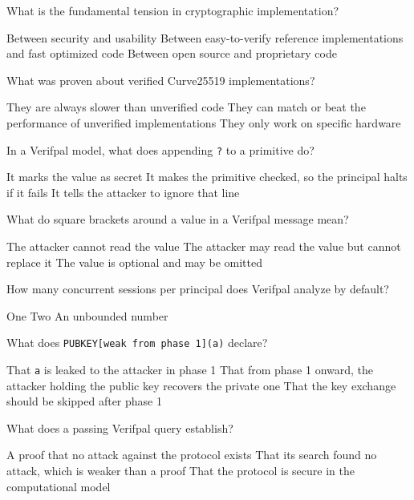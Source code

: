\documentclass[10pt,a4paper,american]{exam}
\begin{document}
\begin{questions}
	\question What is the fundamental tension in cryptographic implementation?
	\begin{randomizechoices}
		\choice Between security and usability
		\CorrectChoice Between easy-to-verify reference implementations and fast optimized code
		\choice Between open source and proprietary code
	\end{randomizechoices}

	\question What was proven about verified Curve25519 implementations?
	\begin{randomizechoices}
		\choice They are always slower than unverified code
		\CorrectChoice They can match or beat the performance of unverified implementations
		\choice They only work on specific hardware
	\end{randomizechoices}

	\question In a Verifpal model, what does appending \texttt{?} to a primitive do?
	\begin{randomizechoices}
		\choice It marks the value as secret
		\CorrectChoice It makes the primitive checked, so the principal halts if it fails
		\choice It tells the attacker to ignore that line
	\end{randomizechoices}

	\question What do square brackets around a value in a Verifpal message mean?
	\begin{randomizechoices}
		\choice The attacker cannot read the value
		\CorrectChoice The attacker may read the value but cannot replace it
		\choice The value is optional and may be omitted
	\end{randomizechoices}

	\question How many concurrent sessions per principal does Verifpal analyze by default?
	\begin{randomizechoices}
		\choice One
		\CorrectChoice Two
		\choice An unbounded number
	\end{randomizechoices}

	\question What does \texttt{PUBKEY[weak from phase 1](a)} declare?
	\begin{randomizechoices}
		\choice That \texttt{a} is leaked to the attacker in phase 1
		\CorrectChoice That from phase 1 onward, the attacker holding the public key recovers the private one
		\choice That the key exchange should be skipped after phase 1
	\end{randomizechoices}

	\question What does a passing Verifpal query establish?
	\begin{randomizechoices}
		\choice A proof that no attack against the protocol exists
		\CorrectChoice That its search found no attack, which is weaker than a proof
		\choice That the protocol is secure in the computational model
	\end{randomizechoices}

\end{questions}

\clearpage

\end{document}
